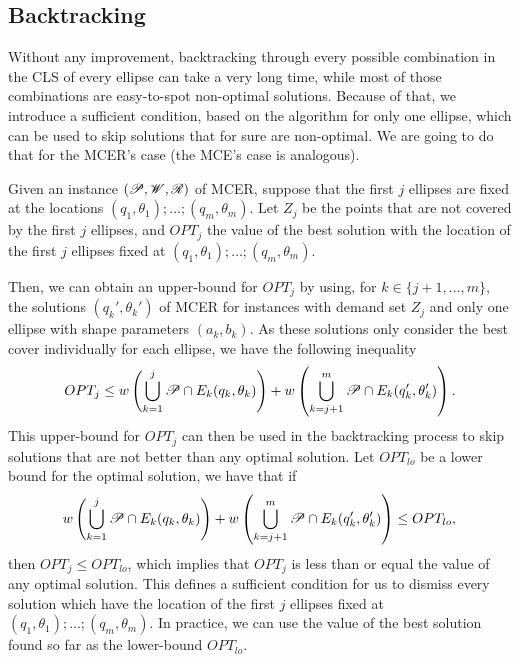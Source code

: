\subsection{Backtracking}

Without any improvement, backtracking through every possible combination in the CLS of every ellipse can take a very long time, while most of those combinations are easy-to-spot non-optimal solutions. 
Because of that, we introduce a sufficient condition, based on the algorithm for only one ellipse, which can be used to skip solutions that for sure are non-optimal.
We are going to do that for the MCER's case (the MCE's case is analogous).

Given an instance $(\mathscr{P}, \mathscr{W}, \mathscr{R})$ of MCER, suppose that the first $j$ ellipses are fixed at the locations $(q_1, \theta_1); \dots; (q_m, \theta_m)$.
Let $Z_j$ be the points that are not covered by the first $j$ ellipses, and $OPT_j$ the value of the best solution with the location of the first $j$ ellipses fixed at $(q_1, \theta_1); \dots; (q_m, \theta_m)$.

Then, we can obtain an upper-bound for $OPT_j$ by using, for $k\in\{j+1, \dots, m\}$, the solutions $(q_k', \theta_k')$ of MCER for instances with demand set $Z_j$ and only one ellipse with shape parameters $(a_k, b_k)$. As these solutions only consider the best cover individually for each ellipse, we have the following inequality
\begin{equation}
OPT_j \le w\left(\bigcup_{k=1}^{j} \mathscr{P} \cap E_k(q_k, \theta_k)\right) + w\left(\bigcup_{k=j+1}^{m} \mathscr{P} \cap E_k(q_k', \theta_k')\right).
\end{equation}
This upper-bound for $OPT_j$ can then be used in the backtracking process to skip solutions that are not better than any optimal solution. Let $OPT_{lo}$ be a lower bound for the optimal solution, we have that if
\begin{equation}
\label{eq:upper-bound}
w\left(\bigcup_{k=1}^{j} \mathscr{P} \cap E_k(q_k, \theta_k)\right) +w\left(\bigcup_{k=j+1}^{m} \mathscr{P} \cap E_k(q_k', \theta_k')\right) \le OPT_{lo},
\end{equation}
then $OPT_j \le OPT_{lo}$, which implies that $OPT_j$ is less than or equal the value of any optimal solution. This defines a sufficient condition for us to dismiss every solution which have the location of the first $j$ ellipses fixed at $(q_1, \theta_1); \dots; (q_m, \theta_m)$. In practice, we can use the value of the best solution found so far as the lower-bound $OPT_{lo}$.

